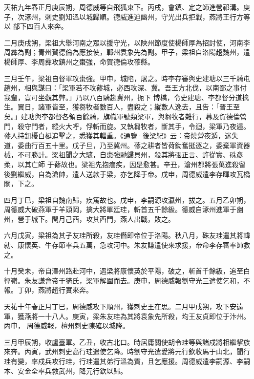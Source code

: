 
\begin{pinyinscope}

 天祐九年春正月庚辰朔，周德威等自飛狐東下。丙戌，會鎮、定之師進營祁溝。庚子，次涿州，刺史劉知溫以城歸順。德威進迫幽州，守光出兵拒戰，燕將王行方等以
 部下四百人來奔。



 二月庚戌朔，梁祖大舉河南之眾以援守光，以陜州節度使楊師厚為招討使，河南李周彞為副；青州賀德倫為應接使，鄆州袁象先為副。甲子，梁祖自洛陽趨魏州，遣楊師厚、李周彞攻鎮州之棗強，命賀德倫攻蓚縣。



 三月壬午，梁祖自督軍攻棗強。甲申，城陷，屠之。時李存審與史建瑭以三千騎屯趙州，相與謀曰：「梁軍若不攻蓚城，必西攻深、冀。吾王方北伐，以南鄙之事付我輩，豈可坐觀其弊。」乃以八百騎趨冀州，扼下
 博橋，令史建瑭、李都督分道擒生。翼日，諸軍皆至，獲芻牧者數百人，盡殺之；縱數人逸去，且告：「晉王至矣。」建瑭與李都督各領百餘騎，旗幟軍號類梁軍，與芻牧者雜行，暮及賀德倫營門，殺守門者，縱火大呼，俘斬而旋。又執芻牧者，斷其手，令迴，梁軍乃夜遁。蓚人持鉏櫌白梃追擊之，悉獲其輜重。《通鑒·後梁紀》云：帝燒營夜遁，迷失道，委曲行百五十里。戊子旦，乃至冀州。蓚之耕者皆荷鋤奮挺逐之，委棄軍資器械，不可勝計。梁祖聞之大駭，自棗強馳歸貝州，殺其將張正言、許從實、硃彥柔，以其亡師
 于蓚故也。梁祖先抱痼疾，因是愈甚。辛丑，滄州都將張萬進殺留後劉繼威，自為滄帥，遣人送款于梁，亦乞降于帝。戊申，周德威遣李存暉攻瓦橋關，下之。



 四月丁巳，梁祖自魏南歸，疾篤故也。戊申，李嗣源攻瀛州，拔之。五月乙卯朔，周德威大破燕軍于羊頭岡，擒大將單廷珪，斬首五千餘級。德威自涿州進軍于幽州，營于城下。閏月己酉，攻其西門，燕人出戰，敗之。



 六月戊寅，梁祖為其子友珪所殺，友珪僭即帝位于洛陽。秋八月，硃友珪遣其將韓
 勍、康懷英、牛存節率兵五萬，急攻河中。朱友謙遣使來求援，帝命李存審率師救之。



 十月癸未，帝自澤州路赴河中，遇梁將康懷英於平陽，破之，斬首千餘級，追至白徑嶺。朱友謙會帝于猗氏，梁軍解圍而去。庚申，周德威報劉守光三遣使乞和，不報。丁卯，燕將趙行實來奔。



 天祐十年春正月丁巳，周德威攻下順州，獲刺史王在思。二月甲戌朔，攻下安遠軍，獲燕將一十八人。庚寅，梁朱友珪為其將袁象先所殺，均王友貞即位于汴州。丙申，
 周德威報，檀州刺史陳確以城降。



 三月甲辰朔，收盧臺軍。乙丑，收古北口。時居庸關使胡令珪等與諸戍將相繼挈族來奔。丙寅，武州刺史高行珪遣使乞降。時劉守光遣愛將元行欽收馬于山北，聞行珪有變，率戍兵攻行珪，行珪遣其弟行溫為質，且乞應援。周德威遣李嗣源、李嗣本、安金全率兵救武州，降元行欽以歸。




\end{pinyinscope}
